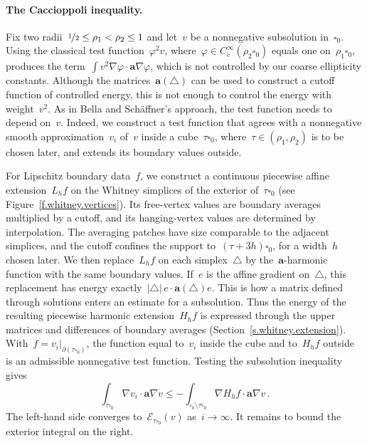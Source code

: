 \documentclass[11pt,letterpaper]{article}
\numberwithin{equation}{section}
\theoremstyle{definition}
\renewcommand{\a}{\mathbf{a}}
\newcommand{\nf}{\nicefrac}
\newcommand{\cu}{\square}
\newcommand{\Ener}{\mathcal E}
\begin{document}
\paragraph{The Caccioppoli inequality.} Fix two radii~$\nf12\leq\rho_1<\rho_2\leq1$ and let~$v$ be a nonnegative subsolution in~$\cu_0$. Using the classical test function~$\varphi^2v$, where~$\varphi\in C^\infty_c(\rho_2\cu_0)$ equals one on~$\rho_1\cu_0$, produces the term~$\int v^2\nabla\varphi\cdot\a\nabla\varphi$, which is not controlled by our coarse ellipticity constants. Although the matrices~$\a(\triangle)$ can be used to construct a cutoff function of controlled energy, this is not enough to control the energy with weight~$v^2$. As in Bella and Sch\"affner's approach, the test function needs to depend on~$v$. Indeed, we construct a test function that agrees with a nonnegative smooth approximation~$v_i$ of~$v$ inside a cube~$\tau\cu_0$, where~$\tau\in(\rho_1,\rho_2)$ is to be chosen later, and extends its boundary values outside.

For Lipschitz boundary data~$f$, we construct a continuous piecewise affine extension~$L_hf$ on the Whitney simplices of the exterior of~$\tau\cu_0$ (see Figure~\ref{f.whitney.vertices}). Its free-vertex values are boundary averages multiplied by a cutoff, and its hanging-vertex values are determined by interpolation. The averaging patches have size comparable to the adjacent simplices, and the cutoff confines the support to~$(\tau+3h)\cu_0$, for a width~$h$ chosen later. We then replace~$L_hf$ on each simplex~$\triangle$ by the~$\a$-harmonic function with the same boundary values. If~$e$ is the affine gradient on~$\triangle$, this replacement has energy exactly~$|\triangle|\,e\cdot\a(\triangle)e$. This is how a matrix defined through solutions enters an estimate for a subsolution. Thus the energy of the resulting piecewise harmonic extension~$H_hf$ is expressed through the upper matrices and differences of boundary averages (Section~\ref{s.whitney.extension}). With~$f=v_i|_{\partial(\tau\cu_0)}$, the function equal to~$v_i$ inside the cube and to~$H_hf$ outside is an admissible nonnegative test function. Testing the subsolution inequality gives
\begin{equation*}
    \int_{\tau\cu_0}\nabla v_i\cdot\a\nabla v
    \leq
    -\int_{\cu_0\setminus\tau\overline{\cu}_0}
        \nabla H_hf\cdot\a\nabla v
    \,.
\end{equation*}
The left-hand side converges to~$\Ener_{\tau\cu_0}(v)$ as~$i\to\infty$. It remains to bound the exterior integral on the right.
\end{document}
